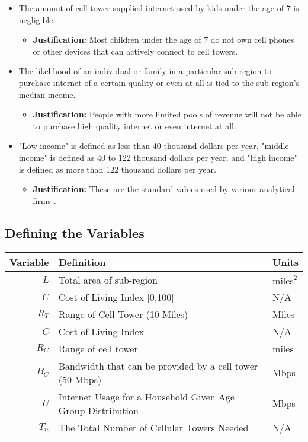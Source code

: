 \documentclass[12pt]{article}
\begin{document}
\begin{itemize}
    \item The amount of cell tower-supplied internet used by kids under the age of 7 is negligible. 
    \begin{itemize} 
        \item \textbf{Justification:} Most children under the age of 7 do not own cell phones or other devices that can actively connect to cell towers.
    \end{itemize}
    \item The likelihood of an individual or family in a particular sub-region to purchase internet of a certain quality or even at all is tied to the sub-region's median income. 
    \begin{itemize} 
        \item \textbf{Justification:} People with more limited pools of revenue will not be able to purchase high quality internet or even internet at all.
    \end{itemize}
    \item "Low income" is defined as less than 40 thousand dollars per year, "middle income" is defined as 40 to 122 thousand dollars per year, and "high income" is defined as more than 122 thousand dollars per year.
    \begin{itemize} 
        \item \textbf{Justification:} These are the standard values used by various analytical firms \cite{pewincomes}.
    \end{itemize}
\end{itemize}

\subsection{Defining the Variables}
\begin{center} 
\begin{tabular}{|r|p{4.15in}|p{1.2in}|}
\hline
\textbf{Variable} & \textbf{Definition} & \textbf{Units}
\\
\hline
$L$ & Total area of sub-region & $\text{miles}^2$
\\
\hline
$C$ & Cost of Living Index [0,100] & N/A
\\
\hline
$R_T$ & Range of Cell Tower (10 Miles) & Miles
\\
\hline
$C$ & Cost of Living Index & N/A
\\
\hline
$R_C$ & Range of cell tower & miles
\\
\hline
$B_C$ & Bandwidth that can be provided by a cell tower (50 Mbps) & Mbps
\\
\hline
$U$ & Internet Usage for a Household Given Age Group Distribution & Mbps
\\
\hline
$T_n$ & The Total Number of Cellular Towers Needed & N/A
\\
\hline
\end{tabular}
\end{center}
\end{document}
